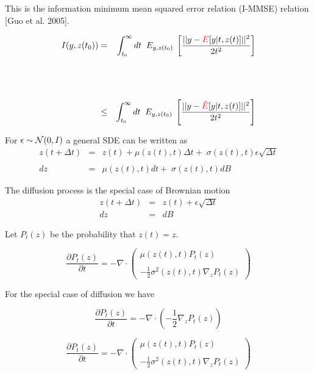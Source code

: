 {{\vfill
This is the information minimum mean squared error relation (I-MMSE) relation [Guo et al. 2005].
}


{\huge
\begin{eqnarray*}
  I(y,z(t_0)) & = & \int_{t_0}^\infty dt \;\; E_{y,z(t_0)}\;\left[\frac{||y - {\color{red}E}[y|t,z(t)]||^2}{2t^2}\right]  \\
  \\
  \\
  \\
  & \leq & \int_{t_0}^\infty dt \;\; E_{y,z(t_0)}\;\left[\frac{||y - {\color{red}\hat{E}}[y|t,z(t)]||^2}{2t^2}\right]
\end{eqnarray*}
}


For $\epsilon \sim {\cal N}(0,I)$ a general SDE can be written as
\begin{eqnarray*}
z(t+\Delta t) & = & z(t) + \mu(z(t),t)\Delta t + \; \sigma(z(t),t)\epsilon\sqrt{\Delta t} \\
\\
dz & = & \mu(z(t),t)dt + \; \sigma(z(t),t)dB
\end{eqnarray*}

\vfill
The diffusion process is the special case of Brownian motion
\begin{eqnarray*}
z(t + \Delta t) & = & z(t) + \epsilon \sqrt{\Delta t} \\
dz & = & dB
\end{eqnarray*}


Let $P_t(z)$ be the probability that $z(t) = z$.

$$\frac{\partial P_t(z)}{\partial t} = - \nabla \cdot\left(\begin{array}{l}\mu(z(t),t)P_t(z) \\ \\ - \frac{1}{2}\sigma^2(z(t),t) \nabla_z P_t(z)\end{array}\right)$$

\vfill
For the special case of diffusion we have

$$\frac{\partial P_t(z)}{\partial t} = - \nabla \cdot\left(-\frac{1}{2}\nabla_z P_t(z)\right)$$

$$\frac{\partial P_t(z)}{\partial t} = - \nabla \cdot\left(\begin{array}{l}\mu(z(t),t)P_t(z) \\ \\ - \frac{1}{2}\sigma^2(z(t),t) \nabla_z P_t(z)\end{array}\right)$$

}
